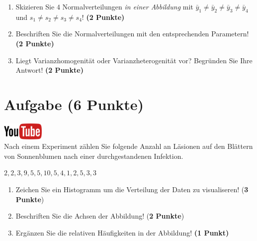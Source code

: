 \documentclass[a4paper, 10pt]{scrartcl}\usepackage[]{graphicx}\usepackage[]{xcolor}
\begin{document}
\begin{enumerate}
\item Skizieren Sie $4$ Normalverteilungen \textit{in einer
    Abbildung} mit $\bar{y}_1 \neq \bar{y}_2 \neq \bar{y}_3 \neq \bar{y}_4$ und $s_1 \neq s_2 \neq s_3 \neq s_4$! \textbf{(2 Punkte)}
\item Beschriften Sie die Normalverteilungen mit den entsprechenden
  Parametern! \textbf{(2 Punkte)}
\item Liegt Varianzhomogenit{\"a}t oder Varianzheterogenit{\"a}t vor? Begr{\"u}nden Sie
  Ihre Antwort! \textbf{(2 Punkte)}
\end{enumerate}

 
\clearpage

\section{Aufgabe \hfill (6 Punkte)}

\hfill\href{https://youtu.be/aXvxGC4YLqk}{\includegraphics[width =
  2cm]{img/youtube}}\\[1Ex]



Nach einem Experiment z{\"a}hlen Sie folgende Anzahl an L{\"a}sionen auf den
Bl{\"a}ttern von Sonnenblumen nach einer durchgestandenen Infektion. 

\begin{center}
$2, 2, 3, 9, 5, 5, 10, 5, 4, 1, 2, 5, 3, 3$
\end{center}

\begin{enumerate}
\item Zeichen Sie ein Histogramm um die Verteilung der Daten zu visualiseren! (\textbf{3 Punkte})
\item Beschriften Sie die Achsen der Abbildung! (\textbf{2 Punkte})
\item Erg{\"a}nzen Sie die relativen H{\"a}ufigkeiten in der Abbildung! \textbf{(1
    Punkt)}  
\end{enumerate}

 
\clearpage
\end{document}
